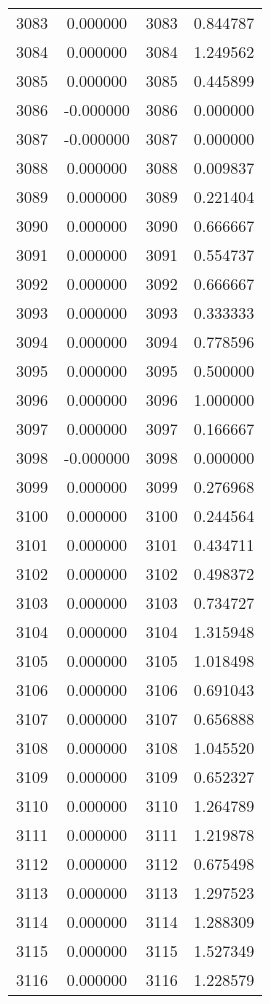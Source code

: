 \documentclass[12pt]{article}
\begin{document}
\begin{longtable}{@{}cccc@{}}
3083 & 0.000000 & 3083 & 0.844787 \\
3084 & 0.000000 & 3084 & 1.249562 \\
3085 & 0.000000 & 3085 & 0.445899 \\
3086 & -0.000000 & 3086 & 0.000000 \\
3087 & -0.000000 & 3087 & 0.000000 \\
3088 & 0.000000 & 3088 & 0.009837 \\
3089 & 0.000000 & 3089 & 0.221404 \\
3090 & 0.000000 & 3090 & 0.666667 \\
3091 & 0.000000 & 3091 & 0.554737 \\
3092 & 0.000000 & 3092 & 0.666667 \\
3093 & 0.000000 & 3093 & 0.333333 \\
3094 & 0.000000 & 3094 & 0.778596 \\
3095 & 0.000000 & 3095 & 0.500000 \\
3096 & 0.000000 & 3096 & 1.000000 \\
3097 & 0.000000 & 3097 & 0.166667 \\
3098 & -0.000000 & 3098 & 0.000000 \\
3099 & 0.000000 & 3099 & 0.276968 \\
3100 & 0.000000 & 3100 & 0.244564 \\
3101 & 0.000000 & 3101 & 0.434711 \\
3102 & 0.000000 & 3102 & 0.498372 \\
3103 & 0.000000 & 3103 & 0.734727 \\
3104 & 0.000000 & 3104 & 1.315948 \\
3105 & 0.000000 & 3105 & 1.018498 \\
3106 & 0.000000 & 3106 & 0.691043 \\
3107 & 0.000000 & 3107 & 0.656888 \\
3108 & 0.000000 & 3108 & 1.045520 \\
3109 & 0.000000 & 3109 & 0.652327 \\
3110 & 0.000000 & 3110 & 1.264789 \\
3111 & 0.000000 & 3111 & 1.219878 \\
3112 & 0.000000 & 3112 & 0.675498 \\
3113 & 0.000000 & 3113 & 1.297523 \\
3114 & 0.000000 & 3114 & 1.288309 \\
3115 & 0.000000 & 3115 & 1.527349 \\
3116 & 0.000000 & 3116 & 1.228579 \\

\end{longtable}
\end{document}
